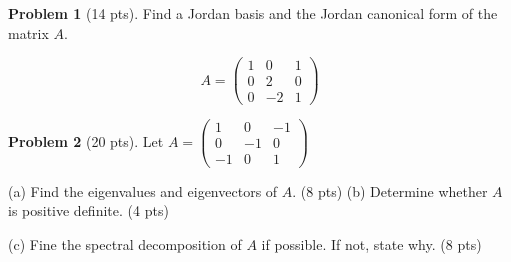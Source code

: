 \documentclass[12pt]{amsart}
\theoremstyle{definition}
\newtheorem{prob}{Problem}
\begin{document}
\newpage

\begin{prob}[14 pts]
Find a Jordan basis and the Jordan canonical form of the matrix $A$.

\[A=\begin{pmatrix}
	1&0&1\\0&2&0\\0&-2&1
\end{pmatrix}\]
	
\end{prob}
\newpage

\begin{prob}[20 pts]
	Let $A=\begin{pmatrix}
		1&0&-1\\0&-1&0\\-1&0&1
	\end{pmatrix}$
	
	(a) Find the eigenvalues and eigenvectors of $A$. (8 pts)
	\vspace{10cm}
	\newpage
	(b) Determine whether $A$ is positive definite. (4 pts) \vspace{8cm}
	
	(c) Fine the spectral decomposition of $A$ if possible. If not, state why. (8 pts)
\end{prob}
\end{document}
